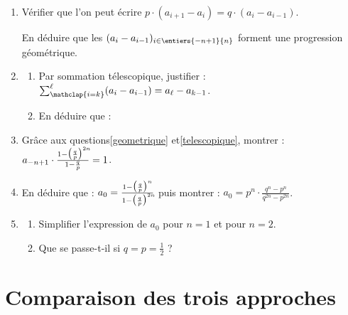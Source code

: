 \documentclass[12pt]{article}
\begin{document}
\begin{enumerate}[resume]
  \item \label{geometrique}Vérifier que l'on peut écrire
    $p \cdot (a_{i+1} - a_i)
    =
    q \cdot (a_{i} - a_{i-1})$.

    En déduire que les $(a_{i} - a_{i-1})_{i\in\entiers{-n+1}{n}}$ forment une progression géométrique.
  \item
    \begin{enumerate}
      \item Par sommation télescopique, justifier : \quad
        \smash
        {%
          $\sum_{\mathclap{i=k}}^{\ell}(a_{i} - a_{i-1}) = a_{\ell} - a_{k-1}$.
        }%
      \item \label{telescopique}En déduire que : \quad
        \moinsLigne[2]
    \end{enumerate}
  \item Grâce aux questions\ref{geometrique} et\ref{telescopique}, montrer : \quad
    $a_{-n+1} \cdot
    \frac
    {%
      1-
      \big(\frac{q}{p}\big)^{2n\!\!}
    }%
    {%
      1-\frac{q}{p}
    }%
    =1
    $.
  \item En déduire que : \quad $a_0 =
    \frac
    {%
      1-
      \big(\frac{q}{p}\big)^{n}
    }%
    {%
      1-
      \big(\frac{q}{p}\big)^{2n\!\!}
    }%
    $ \quad  puis montrer : \quad
    $a_0 = p^{n} \cdot \frac{q^{n} - p^{n}}{q^{2n} - p^{2n}}$.
  \item 
    \begin{enumerate}
      \item Simplifier l'expression de $a_0$ pour $n=1$ et pour $n=2$.
      \item Que se passe-t-il si $q=p=\frac{1}{2}$ ?
    \end{enumerate}
\end{enumerate}
  
\section{Comparaison des trois approches}
\end{document}
